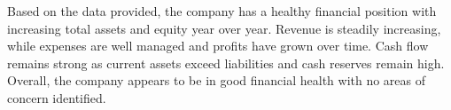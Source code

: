 

Based on the data provided, the company has a healthy financial position with increasing total assets and equity year over year. Revenue is steadily increasing, while expenses are well managed and profits have grown over time. Cash flow remains strong as current assets exceed liabilities and cash reserves remain high. Overall, the company appears to be in good financial health with no areas of concern identified.